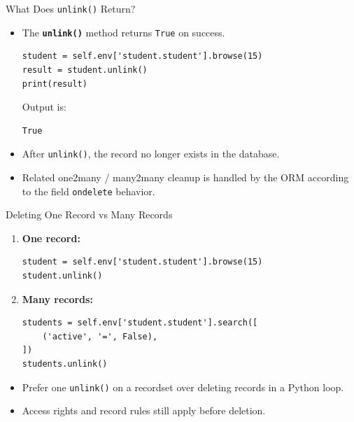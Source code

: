 \begin{frame}[fragile]{What Does \texttt{unlink()} Return?}
	\begin{block}{}
		\begin{itemize}
			\item The \textbf{\texttt{unlink()}} method returns \texttt{True} on success.
\begin{lstlisting}
student = self.env['student.student'].browse(15)
result = student.unlink()
print(result)
\end{lstlisting}
			Output is:
\begin{lstlisting}
True
\end{lstlisting}
			\item After \texttt{unlink()}, the record no longer exists in the database.
			\item Related one2many / many2many cleanup is handled by the ORM according to the field \texttt{ondelete} behavior.
		\end{itemize}
	\end{block}
\end{frame}

\begin{frame}[fragile]{Deleting One Record vs Many Records}
	\begin{enumerate}
		\item \textbf{One record:}
\begin{lstlisting}
student = self.env['student.student'].browse(15)
student.unlink()
\end{lstlisting}
		\item \textbf{Many records:}
\begin{lstlisting}
students = self.env['student.student'].search([
	('active', '=', False),
])
students.unlink()
\end{lstlisting}
	\end{enumerate}
	\begin{itemize}
		\item Prefer one \texttt{unlink()} on a recordset over deleting records in a Python loop.
		\item Access rights and record rules still apply before deletion.
	\end{itemize}
\end{frame}

